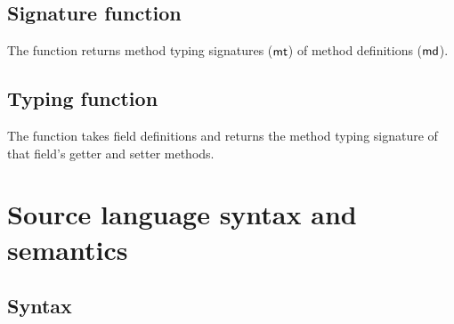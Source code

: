 \documentclass[a4paper,USenglish]{tex/lipics-v2016}
\begin{document}
\subsection{Signature function}

The  function returns method typing signatures ($\mt$) of method definitions ($\md$).

\begin{mathpar}



\end{mathpar}

\subsection{Typing function}

The  function takes field definitions and returns the method typing signature of that field's getter and setter methods. 

\begin{mathpar}
\end{mathpar}

\clearpage

\section{Source language syntax and semantics}

\subsection{Syntax}
\end{document}
